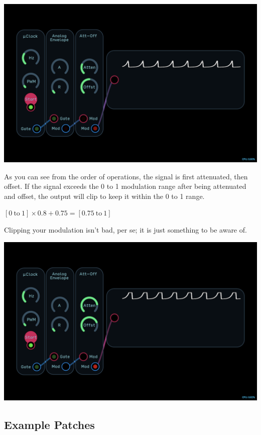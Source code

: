 \documentclass[11pt]{book}
\begin{document}
\begin{multicols*}{2}
\begin{center}
\includegraphics[width=0.95\linewidth]{attenuate-offset-fig2.png}
\end{center}

As you can see from the order of operations, the signal is first attenuated, then offset. If the signal exceeds the 0 to 1 modulation range after being attenuated and offset, the output will clip to keep it within the 0 to 1 range.

\begin{center}
	$[0 \ \textrm{to} \ 1] \times 0.8+0.75=[0.75 \ \textrm{to} \ 1]$ 
\end{center}

Clipping your modulation isn't bad, per se; it is just something to be aware of.

\begin{center}
\includegraphics[width=0.95\linewidth]{attenuate-offset-fig3.png}
\end{center}

\subsection*{Example Patches}


\end{multicols*}
\end{document}
